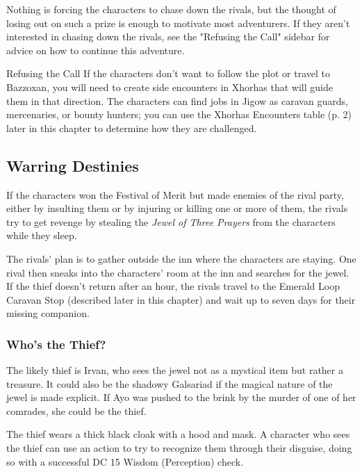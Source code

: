 \documentclass[letterpaper, 11pt, bg=full, twocolumn]{dndbook}
\begin{document}
Nothing is forcing the characters to chase down the rivals, but the thought of losing out on such a prize is enough to motivate most adventurers. If they aren't interested in chasing down the rivals, see the "Refusing the Call" sidebar for advice on how to continue this adventure.

\begin{DndSidebar}{Refusing the Call}
If the characters don't want to follow the plot or travel to Bazzoxan, you will need to create side encounters in Xhorhas that will guide them in that direction. The characters can find jobs in Jigow as caravan guards, mercenaries, or bounty hunters; you can use the Xhorhas Encounters table (p. 2) later in this chapter to determine how they are challenged.
\end{DndSidebar}

\subsection{Warring Destinies}

If the characters won the Festival of Merit but made enemies of the rival party, either by insulting them or by injuring or killing one or more of them, the rivals try to get revenge by stealing the \textit{Jewel of Three Prayers} from the characters while they sleep.

The rivals' plan is to gather outside the inn where the characters are staying. One rival then sneaks into the characters' room at the inn and searches for the jewel. If the thief doesn't return after an hour, the rivals travel to the Emerald Loop Caravan Stop (described later in this chapter) and wait up to seven days for their missing companion.

\subsubsection{Who's the Thief?}

The likely thief is Irvan, who sees the jewel not as a mystical item but rather a treasure. It could also be the shadowy Galsariad if the magical nature of the jewel is made explicit. If Ayo was pushed to the brink by the murder of one of her comrades, she could be the thief.

The thief wears a thick black cloak with a hood and mask. A character who sees the thief can use an action to try to recognize them through their disguise, doing so with a successful DC 15 Wisdom (Perception) check.
\end{document}
